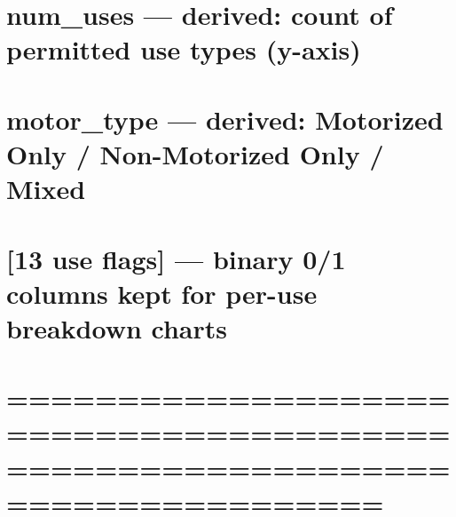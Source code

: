 \documentclass[
]{article}
\begin{document}
\section{num\_uses --- derived: count of permitted use types
(y-axis)}\label{num_uses-derived-count-of-permitted-use-types-y-axis}

\section{motor\_type --- derived: Motorized Only / Non-Motorized Only /
Mixed}\label{motor_type-derived-motorized-only-non-motorized-only-mixed}

\section{{[}13 use flags{]} --- binary 0/1 columns kept for per-use
breakdown
charts}\label{use-flags-binary-01-columns-kept-for-per-use-breakdown-charts}

\section{=============================================================================}\label{section-14}
\end{document}
